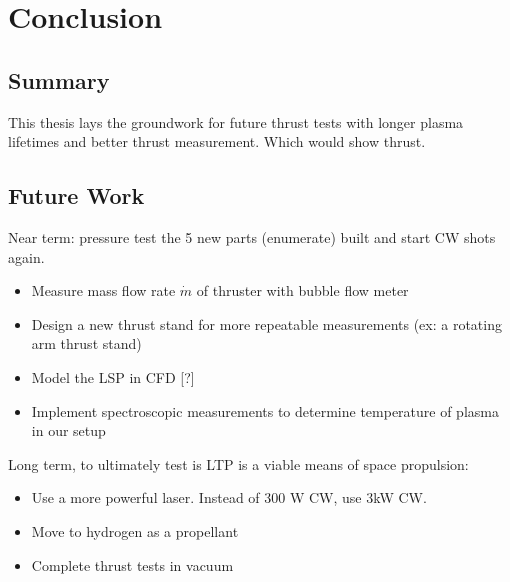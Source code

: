 \chapter{Conclusion}

    \section{Summary}


        This thesis lays the groundwork for future thrust tests with longer plasma lifetimes and better thrust measurement. Which would show thrust.

    \section{Future Work}

        Near term: pressure test the 5 new parts (enumerate) built and start CW shots again.

        \begin{itemize}
            \item Measure mass flow rate $\dot m$ of thruster with bubble flow meter
            \item Design a new thrust stand for more repeatable measurements (ex: a rotating arm thrust stand)
            \item Model the LSP in CFD [?]
            \item Implement spectroscopic measurements to determine temperature of plasma in our setup
        \end{itemize}

        Long term, to ultimately test is LTP is a viable means of space propulsion:

        \begin{itemize}
            \item Use a more powerful laser. Instead of 300 W CW, use 3kW CW.
            \item Move to hydrogen as a propellant
            \item Complete thrust tests in vacuum
        \end{itemize}


        
        
        
        
        
        
        
        
 
